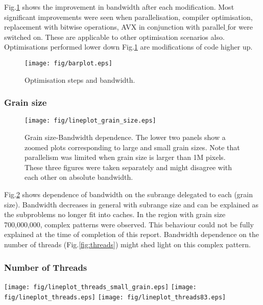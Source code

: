 \documentclass[journal]{IEEEtran}
\begin{document}
Fig.\ref{fig:opstep} shows the improvement in bandwidth after each modification. Most significant improvements were seen when parallelisation, compiler optimisation, replacement with bitwise operations, AVX in conjunction with parallel$\_$for were switched on. These are applicable to other optimisation scenarios also. \\
Optimisations performed lower down Fig.\ref{fig:opstep} are modifications of code higher up.

\begin{figure}[h]
\centering
\texttt{[image: fig/barplot.eps]}
\caption{Optimisation steps and bandwidth. }
\label{fig:opstep}
\end{figure}

\subsubsection{Grain size}
\begin{figure}[h]
\centering
\texttt{[image: fig/lineplot\_grain\_size.eps]}
\caption{Grain size-Bandwidth dependence. The lower two panels show a zoomed plots corresponding to large and small grain sizes. Note that parallelism was limited when grain size is larger than \texttildelow 1M pixels. These three figures were taken separately and might disagree with each other on absolute bandwidth.}\label{grain_size}
\end{figure}

Fig.\ref{grain_size} shows dependence of bandwidth on the subrange delegated to each (grain size). Bandwidth decreases in general with subrange size and can be explained as the subproblems no longer fit into caches. In the region with grain size 700,000,000, complex patterns were observed. This behaviour could not be fully explained at the time of completion of this report. Bandwidth dependence on the number of threads (Fig.\ref{fig:threads}) might shed light on this complex pattern. \\

\subsubsection{Number of Threads}

\begin{figure*}[tb]
  \texttt{[image: fig/lineplot\_threads\_small\_grain.eps]}
\endminipage\hfill
{}
  \texttt{[image: fig/lineplot\_threads.eps]}
\endminipage\hfill
{}%
  \texttt{[image: fig/lineplot\_threads83.eps]}
\endminipage

\caption{Bandwidth-Number of Threads dependence. The first two graphs were taken at constant grain size. The graph on the right was taken for various grain sizes on server 83. Note the onsets of saturation at 5 and 8 threads (1058400), 3 and 9 threads (793800), 11 threads (352800). Grain sizes were chosen arbitrarily.}\label{fig:threads}
\end{figure*}
\end{document}
